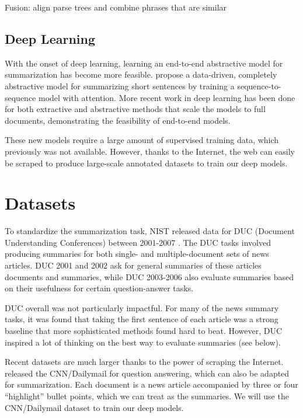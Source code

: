 \documentclass[11pt]{report}
\begin{document}
Fusion: align parse trees and combine phrases that are similar 


\subsection{Deep Learning}

With the onset of deep learning, learning an end-to-end abstractive model for summarization has become more feasible. \citet{rush2015neural} propose a data-driven, completely abstractive model for summarizing short sentences by training a sequence-to-sequence model with attention. More recent work in deep learning has been done for both extractive \citep{} %
and abstractive \citep{nallapati2016seq2seq} methods that scale the models to full documents, demonstrating the feasibility of end-to-end models.

These new models require a large amount of supervised training data, which previously was not available. However, thanks to the Internet, the web can easily be scraped to produce large-scale annotated datasets to train our deep models.


\section{Datasets}

To standardize the summarization task, NIST released data for DUC (Document Understanding Conferences) between 2001-2007 \citep{over2007duc}. The DUC tasks involved producing summaries for both single- and multiple-document sets of news articles. DUC 2001 and 2002 ask for general summaries of these articles documents and summaries, while DUC 2003-2006 also evaluate summaries based on their usefulness for certain question-answer tasks.


DUC overall was not particularly impactful. For many of the news summary tasks, it was found that taking the first sentence of each article was a strong baseline that more sophisticated methods found hard to beat. However, DUC inspired a lot of thinking on the best way to evaluate summaries (see below).

Recent datasets are much larger thanks to the power of scraping the Internet. \citet{Hermann2015} released the CNN/Dailymail for question answering, which can also be adapted for summarization. Each document is a news article accompanied by three or four ``highlight'' bullet points, which we can treat as the summaries. We will use the CNN/Dailymail dataset to train our deep models.
\end{document}
